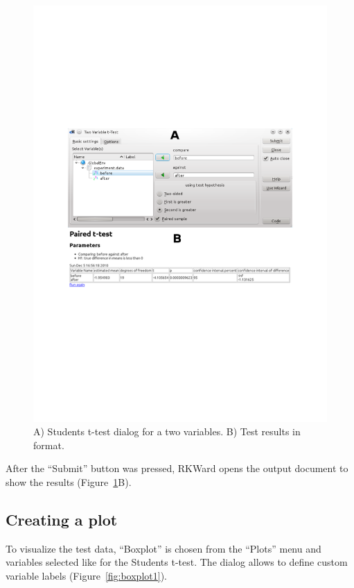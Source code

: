 \begin{figure}[htp]
 \centering
 \includegraphics[clip=true,trim=0cm 5.7cm 0cm 5.7cm,width=16cm]{../figures/t-test.pdf}
 \caption{A) Students t-test dialog for a two variables. B) Test results in  format.}
 \label{fig:t_test}
\end{figure}

After the ``Submit'' button was pressed, RKWard opens the output document
to show the results (Figure~\ref{fig:t_test}B).

\subsection{Creating a plot}
\label{sec:create_plot}
To visualize the test data, ``Boxplot'' is chosen from the ``Plots'' menu
and variables selected like for the Students t-test.
The dialog allows to define custom variable labels (Figure~\ref{fig:boxplot1}).


